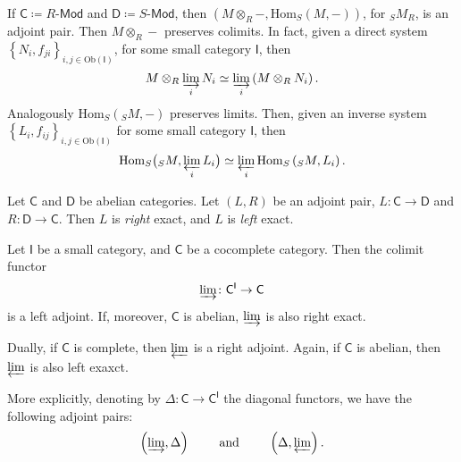 \begin{ex}
	If $\mathsf{C} \coloneqq R\text{-}\mathsf{Mod}$ and $\mathsf{D}\coloneqq S\text{-}\mathsf{Mod}$, then
	$\left(M \otimes_R -, \mathrm{Hom}_{S}\left( M, - \right)\right)$, for ${}_SM_R$, is an adjoint pair.
	Then $M \otimes_R -$ preserves colimits.
	In fact, given a direct system $\left\{N_i, f_{ji}\right\}_{i, j \in \mathrm{Ob} \left(\mathsf{I}\right)}$, 
	for some small category $\mathsf{I}$, then
	\begin{equation}
		M \otimes_R \varinjlim_i N_i \simeq \varinjlim_i \left( M \otimes_R N_i \right)
	.\end{equation} 
	Analogously $\mathrm{Hom}_{S}\left( {}_S M, - \right)$ preserves limits.
	Then, given an inverse system $\left\{ L_i, f_{ij} \right\}_{i,j \in \mathrm{Ob} \left(\mathsf{I}\right)}$
	for some small category $\mathsf{I}$, then
	\begin{equation}
		\mathrm{Hom}_{S}\big( {}_S M, \varprojlim_i L_i \big) \simeq
		\varprojlim_i \mathrm{Hom}_{ S}\left( {}_S M, L_i \right)
	.\end{equation} 
\end{ex} 

\begin{rem}
	Let $\mathsf{C}$ and $\mathsf{D}$ be abelian categories.
	Let $\left(L, R\right)$ be an adjoint pair, $L\colon \mathsf{C} \to \mathsf{D}$ and $R\colon \mathsf{D} \to \mathsf{C}$.
	Then $L$ is {\em right} exact, and $L$ is {\em left} exact.
\end{rem}

\begin{prop}
	Let $\mathsf{I}$ be a small category, and $\mathsf{C}$ be a cocomplete category.
	Then the colimit functor
	\begin{equation}
	\varinjlim\colon \mathsf{C}^{\mathsf{I}} \to \mathsf{C}
	\end{equation} 
	is a left adjoint.
	If, moreover, $\mathsf{C}$ is abelian, $\varinjlim$ is also right exact.

	Dually, if $\mathsf{C}$ is complete, then $\varprojlim$	is a right adjoint.
	Again, if $\mathsf{C}$ is abelian, then $\varprojlim$ is also left exaxct.

	More explicitly, denoting by $\Delta\colon \mathsf{C} \to \mathsf{C}^{\mathsf{I}}$
	the diagonal functors, we have the following adjoint pairs:
	\begin{equation*}
	\left(\varinjlim, \Delta\right)
	\qquad \text{ and } \qquad
	\left(\Delta, \varprojlim\right)
	.\end{equation*}
\end{prop} 
